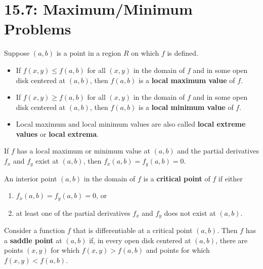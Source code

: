 \documentclass[mathNotesPreamble]{subfiles}
\begin{document}
\section{15.7: Maximum/Minimum Problems}

  \begin{defn*}
    Suppose $(a,b)$ is a point in a region $R$ on which $f$ is defined. 
    \begin{itemize}
      \item 
        If $f(x,y)\leq f(a,b)$ for all $(x,y)$ in the domain of $f$ and in some open disk centered at $(a,b)$, then $f(a,b)$ is a \textbf{local maximum value} of $f$.
      \item 
        If $f(x,y)\geq f(a,b)$ for all $(x,y)$ in the domain of $f$ and in some open disk centered at $(a,b)$, then $f(a,b)$ is a \textbf{local minimum value} of $f$.
      \item 
        Local maximum and local minimum values are also called \textbf{local extreme values} or \textbf{local extrema}.
    \end{itemize}
  \end{defn*}

  \begin{thmBox*}
    If $f$ has a local maximum or minimum value at $(a,b)$ and the partial derivatives $f_x$ and $f_y$ exist at $(a,b)$, then $f_x(a,b)=f_y(a,b)=0$.
  \end{thmBox*}

  \begin{defn*}
    An interior point $(a,b)$ in the domain of $f$ is a \textbf{critical point} of $f$ if either
    \begin{enumerate}
      \item 
        $f_x(a,b)=f_y(a,b)=0$, or
      \item 
        at least one of the partial derivatives $f_x$ and $f_y$ does not exist at $(a,b)$.
    \end{enumerate}
  \end{defn*}

  \begin{defn*}
    Consider a function $f$ that is differentiable at a critical point $(a,b)$. Then $f$ has a \textbf{saddle point} at $(a,b)$ if, in every open disk centered at $(a,b)$, there are points $(x,y)$ for which $f(x,y)>f(a,b)$ and points for which $f(x,y)<f(a,b)$.
  \end{defn*}
\end{document}
